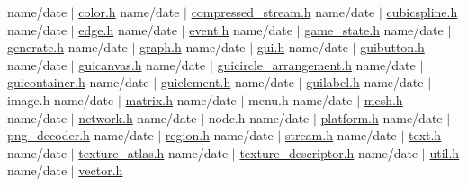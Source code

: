 name/date $\vert$ \hyperlink{color_8h_source}{color.\+h} name/date $\vert$ \hyperlink{compressed__stream_8h_source}{compressed\+\_\+stream.\+h} name/date $\vert$ \hyperlink{cubicspline_8h_source}{cubicspline.\+h} name/date $\vert$ \hyperlink{edge_8h_source}{edge.\+h} name/date $\vert$ \hyperlink{event_8h_source}{event.\+h} name/date $\vert$ \hyperlink{game__state_8h_source}{game\+\_\+state.\+h} name/date $\vert$ \hyperlink{generate_8h_source}{generate.\+h} name/date $\vert$ \hyperlink{graph_8h_source}{graph.\+h} name/date $\vert$ \hyperlink{gui_8h_source}{gui.\+h} name/date $\vert$ \hyperlink{guibutton_8h_source}{guibutton.\+h} name/date $\vert$ \hyperlink{guicanvas_8h_source}{guicanvas.\+h} name/date $\vert$ \hyperlink{guicircle__arrangement_8h_source}{guicircle\+\_\+arrangement.\+h} name/date $\vert$ \hyperlink{guicontainer_8h_source}{guicontainer.\+h} name/date $\vert$ \hyperlink{guielement_8h_source}{guielement.\+h} name/date $\vert$ \hyperlink{guilabel_8h_source}{guilabel.\+h} name/date $\vert$ image.\+h name/date $\vert$ \hyperlink{matrix_8h_source}{matrix.\+h} name/date $\vert$ menu.\+h name/date $\vert$ \hyperlink{mesh_8h_source}{mesh.\+h} name/date $\vert$ \hyperlink{network_8h_source}{network.\+h} name/date $\vert$ node.\+h name/date $\vert$ \hyperlink{platform_8h_source}{platform.\+h} name/date $\vert$ \hyperlink{png__decoder_8h_source}{png\+\_\+decoder.\+h} name/date $\vert$ \hyperlink{region_8h_source}{region.\+h} name/date $\vert$ \hyperlink{stream_8h_source}{stream.\+h} name/date $\vert$ \hyperlink{text_8h_source}{text.\+h} name/date $\vert$ \hyperlink{texture__atlas_8h_source}{texture\+\_\+atlas.\+h} name/date $\vert$ \hyperlink{texture__descriptor_8h_source}{texture\+\_\+descriptor.\+h} name/date $\vert$ \hyperlink{util_8h_source}{util.\+h} name/date $\vert$ \hyperlink{vector_8h_source}{vector.\+h} 